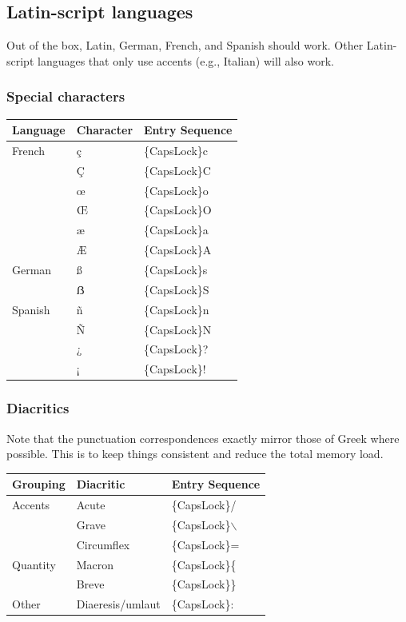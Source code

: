 \documentclass[11pt]{article}
\begin{document}
\subsection{Latin-script languages}
\label{sec:org805c871}

Out of the box, Latin, German, French, and Spanish should work. Other Latin-script languages that only use accents (e.g., Italian) will also work.

\subsubsection{Special characters}
\label{sec:org2050a9a}

\begin{center}
\begin{tabular}{lll}
Language & Character & Entry Sequence\\
\hline
French & ç & \{CapsLock\}c\\
 & Ç & \{CapsLock\}C\\
 & œ & \{CapsLock\}o\\
 & Œ & \{CapsLock\}O\\
 & æ & \{CapsLock\}a\\
 & Æ & \{CapsLock\}A\\
German & ß & \{CapsLock\}s\\
 & ẞ & \{CapsLock\}S\\
Spanish & ñ & \{CapsLock\}n\\
 & Ñ & \{CapsLock\}N\\
 & ¿ & \{CapsLock\}?\\
 & ¡ & \{CapsLock\}!\\
\end{tabular}
\end{center}

\subsubsection{Diacritics}
\label{sec:orgd7c91be}

Note that the punctuation correspondences exactly mirror those of Greek where possible. This is to keep things consistent and reduce the total memory load.

\begin{center}
\begin{tabular}{lll}
Grouping & Diacritic & Entry Sequence\\
\hline
Accents & Acute & \{CapsLock\}/\\
 & Grave & \{CapsLock\}$\backslash$\\
 & Circumflex & \{CapsLock\}=\\
Quantity & Macron & \{CapsLock\}\{\\
 & Breve & \{CapsLock\}\}\\
Other & Diaeresis/umlaut & \{CapsLock\}:\\
\end{tabular}
\end{center}
\end{document}
